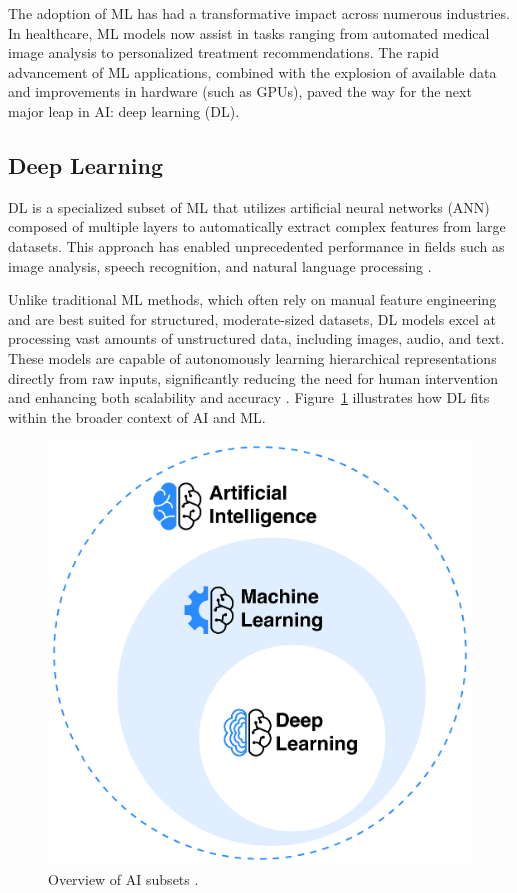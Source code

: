 \documentclass[a4paper,10pt]{book}
\begin{document}
The adoption of ML has had a transformative impact across numerous industries. In healthcare, ML models now assist in tasks ranging from automated medical image analysis to personalized treatment recommendations. The rapid advancement of ML applications, combined with the explosion of available data and improvements in hardware (such as GPUs), paved the way for the next major leap in AI: deep learning (DL).


\subsection{Deep Learning}

DL is a specialized subset of ML that utilizes artificial neural networks (ANN) composed of multiple layers to automatically extract complex features from large datasets. This approach has enabled unprecedented performance in fields such as image analysis, speech recognition, and natural language processing  \cite{holdsworthWhatDeepLearning2024}.

Unlike traditional ML methods, which often rely on manual feature engineering and are best suited for structured, moderate-sized datasets, DL models excel at processing vast amounts of unstructured data, including images, audio, and text. These models are capable of autonomously learning hierarchical representations directly from raw inputs, significantly reducing the need for human intervention and enhancing both scalability and accuracy \cite{holdsworthWhatDeepLearning2024}. Figure~\ref{fig:ai_overview} illustrates how DL fits within the broader context of AI and ML.

\begin{figure}[h!]
    \centering
    \includegraphics[width=0.5\linewidth]{reports//assets/ai.png}
    \caption[AI subsets overview]{Overview of AI subsets \cite{nasaWhatArtificialIntelligence}.}
    \label{fig:ai_overview}
\end{figure}
\end{document}
